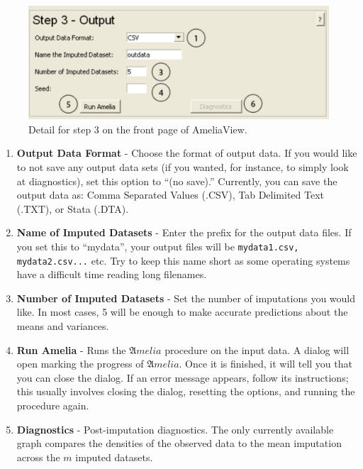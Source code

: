 \documentclass[12pt,titlepage]{article}
\begin{document}
\begin{figure}[ht]
  \centering
  \includegraphics[scale=.75]{step3}
  \caption{Detail for step 3 on the front page of AmeliaView.}
\end{figure}
\begin{enumerate}
\item \textbf{Output Data Format} - Choose the format of output data.  If you would like to not save any output data sets (if you wanted, for instance, to simply look at diagnostics), set this option to ``(no save).''  Currently, you can save the output data as: Comma Separated Values (.CSV), Tab Delimited Text (.TXT), or Stata (.DTA).
\item \textbf{Name of Imputed Datasets} - Enter the prefix for the output data files.  If you set this to ``mydata'', your output files will be \texttt{mydata1.csv, mydata2.csv...} etc.  Try to keep this name short as some operating systems have a difficult time reading long filenames.
\item \textbf{Number of Imputed Datasets} - Set the number of imputations you would like.  In most cases, 5 will be enough to make accurate predictions about the means and variances.  
\item \textbf{Run Amelia} - Runs the ${\mathfrak Amelia}$ procedure on the input data.  A dialog will open marking the progress of ${\mathfrak Amelia}$.  Once it is finished, it will tell you that you can close the dialog.  If an error message appears, follow its instructions;  this usually involves closing the dialog, resetting the options, and running the procedure again.  
\item \textbf{Diagnostics} - Post-imputation diagnostics.  The only currently available graph compares the densities of the observed data to the mean imputation across the $m$ imputed datasets. 
\end{enumerate}
\end{document}
